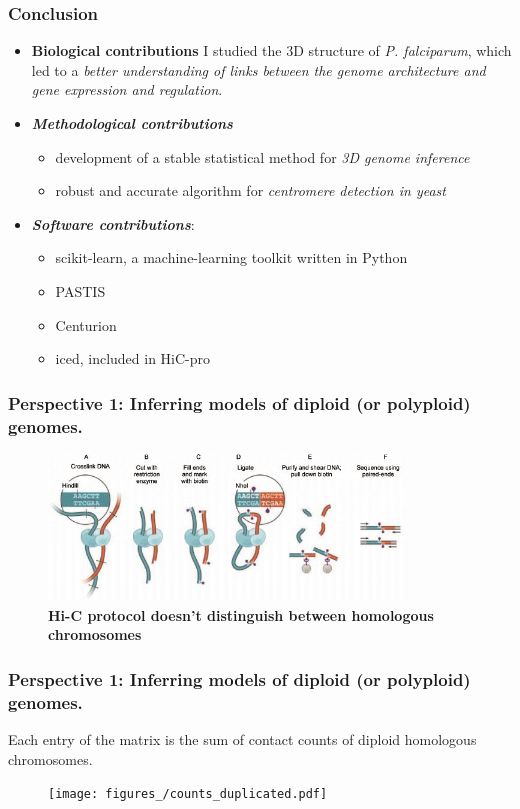\documentclass[xcolor=dvipsnames]{beamer}
\begin{document}
\begin{frame}
\frametitle{Conclusion}
\begin{itemize}[label={$\bullet$}]
\item \textbf{Biological contributions} I
studied the 3D structure of {\em P. falciparum}, which led to a \textit{better
understanding of links between the genome architecture and gene expression and
regulation}.
\item \textbf{\em Methodological contributions}
\begin{itemize}[label={$\bullet$}]
\item development of a stable statistical method for \textit{3D genome
inference}
\item robust and accurate algorithm for \textit{centromere detection in yeast} 
\end{itemize}
\item \textbf{\em Software contributions}: 
\begin{itemize}[label={$\bullet$}]
\item scikit-learn, a machine-learning toolkit written in Python
\item PASTIS
\item Centurion
\item iced, included in HiC-pro
\end{itemize}
\end{itemize}
\end{frame}

\begin{frame}
\frametitle{Perspective 1: Inferring models of diploid (or polyploid) genomes.}
\begin{figure}
\centering
\includegraphics[width=0.85\textwidth]{figures/hic_protocol.jpg}
\caption{\textbf{Hi-C protocol doesn't distinguish between homologous
chromosomes} \citep{rao:3d}}
\end{figure}
\end{frame}



\begin{frame}
\frametitle{Perspective 1: Inferring models of diploid (or polyploid) genomes.}
{\color{Blue} Each entry of the matrix is the sum of contact counts of diploid
homologous chromosomes.}

\begin{figure}
\begin{center}
\texttt{[image: figures\_/counts\_duplicated.pdf]}
\end{center}
\end{figure}

\end{frame}
\end{document}
